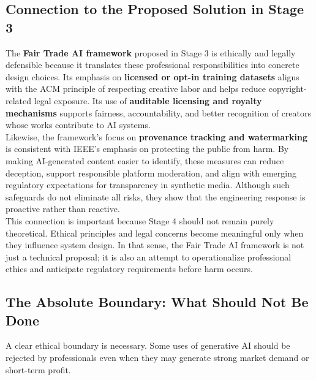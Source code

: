 \subsection{Connection to the Proposed Solution in Stage 3}

The \textbf{Fair Trade AI framework} proposed in Stage 3 is ethically and legally defensible because it translates these professional responsibilities into concrete design choices. Its emphasis on \textbf{licensed or opt-in training datasets} aligns with the ACM principle of respecting creative labor and helps reduce copyright-related legal exposure. Its use of \textbf{auditable licensing and royalty mechanisms} supports fairness, accountability, and better recognition of creators whose works contribute to AI systems. \\

Likewise, the framework's focus on \textbf{provenance tracking and watermarking} is consistent with IEEE's emphasis on protecting the public from harm. By making AI-generated content easier to identify, these measures can reduce deception, support responsible platform moderation, and align with emerging regulatory expectations for transparency in synthetic media. Although such safeguards do not eliminate all risks, they show that the engineering response is proactive rather than reactive. \\

This connection is important because Stage 4 should not remain purely theoretical. Ethical principles and legal concerns become meaningful only when they influence system design. In that sense, the Fair Trade AI framework is not just a technical proposal; it is also an attempt to operationalize professional ethics and anticipate regulatory requirements before harm occurs.

\subsection{The Absolute Boundary: What Should Not Be Done}

A clear ethical boundary is necessary. Some uses of generative AI should be rejected by professionals even when they may generate strong market demand or short-term profit.

